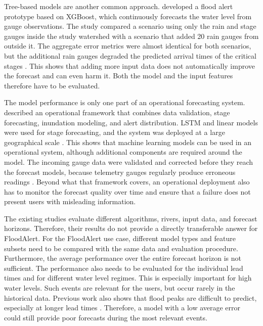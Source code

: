 Tree-based models are another common approach. \citeauthor{sandersDataDrivenFloodAlert2022} developed a flood alert prototype based on XGBoost, which continuously forecasts the water level from gauge observations. The study compared a scenario using only the rain and stage gauges inside the study watershed with a scenario that added 20 rain gauges from outside it. The aggregate error metrics were almost identical for both scenarios, but the additional rain gauges degraded the predicted arrival times of the critical stages \cite{sandersDataDrivenFloodAlert2022}. This shows that adding more input data does not automatically improve the forecast and can even harm it. Both the model and the input features therefore have to be evaluated.

The model performance is only one part of an operational forecasting system. \citeauthor{nevoFloodForecastingMachine2022} described an operational framework that combines data validation, stage forecasting, inundation modeling, and alert distribution. \ac{LSTM} and linear models were used for stage forecasting, and the system was deployed at a large geographical scale \cite{nevoFloodForecastingMachine2022}. This shows that machine learning models can be used in an operational system, although additional components are required around the model. The incoming gauge data were validated and corrected before they reach the forecast models, because telemetry gauges regularly produce erroneous readings \cite{nevoFloodForecastingMachine2022}. Beyond what that framework covers, an operational deployment also has to monitor the forecast quality over time and ensure that a failure does not present users with misleading information.

The existing studies evaluate different algorithms, rivers, input data, and forecast horizons. Therefore, their results do not provide a directly transferable answer for FloodAlert. For the FloodAlert use case, different model types and feature subsets need to be compared with the same data and evaluation procedure. Furthermore, the average performance over the entire forecast horizon is not sufficient. The performance also needs to be evaluated for the individual lead times and for different water level regimes. This is especially important for high water levels. Such events are relevant for the users, but occur rarely in the historical data. Previous work also shows that flood peaks are difficult to predict, especially at longer lead times \cite{dazziFloodStageForecasting2021}. Therefore, a model with a low average error could still provide poor forecasts during the most relevant events.

